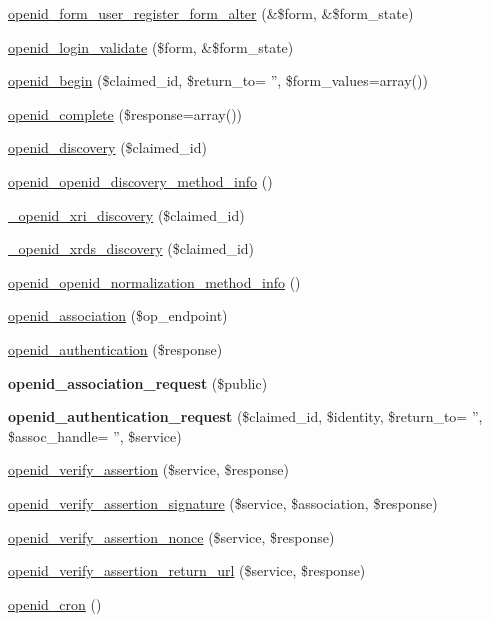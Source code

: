 \begin{DoxyCompactItemize}
\item 
\hyperlink{openid_8module_a3e72c243b50c2c5382c2ca88a9d8798f}{openid\_\-form\_\-user\_\-register\_\-form\_\-alter} (\&\$form, \&\$form\_\-state)
\item 
\hyperlink{openid_8module_aae1394cded5f4c7167dc90307929472c}{openid\_\-login\_\-validate} (\$form, \&\$form\_\-state)
\item 
\hyperlink{openid_8module_a09025e6f08d24b6630a5bc95d26d1fcf}{openid\_\-begin} (\$claimed\_\-id, \$return\_\-to= '', \$form\_\-values=array())
\item 
\hyperlink{openid_8module_a5d4362ca6e1e5f62daa2de3f5b6709f3}{openid\_\-complete} (\$response=array())
\item 
\hyperlink{openid_8module_ae52417e5179c251a3256583ea3e67d30}{openid\_\-discovery} (\$claimed\_\-id)
\item 
\hyperlink{openid_8module_adf3edad18f0e31d9dc5c2ed6429f1983}{openid\_\-openid\_\-discovery\_\-method\_\-info} ()
\item 
\hyperlink{openid_8module_a8fe2a535999c4dbbea783966cf26443f}{\_\-openid\_\-xri\_\-discovery} (\$claimed\_\-id)
\item 
\hyperlink{openid_8module_a90d1aa7f4e4f3778d16564d1db5ecf14}{\_\-openid\_\-xrds\_\-discovery} (\$claimed\_\-id)
\item 
\hyperlink{openid_8module_a24787fe76c0379844feb68970ee993fb}{openid\_\-openid\_\-normalization\_\-method\_\-info} ()
\item 
\hyperlink{openid_8module_a305374e14009f439fbef9733223b6660}{openid\_\-association} (\$op\_\-endpoint)
\item 
\hyperlink{openid_8module_a40916dd14d08da91ecd140824aac9578}{openid\_\-authentication} (\$response)
\item 
\hypertarget{openid_8module_a1a7ae0472128ef1eb4ee9046fc50a67c}{
{\bfseries openid\_\-association\_\-request} (\$public)}
\label{openid_8module_a1a7ae0472128ef1eb4ee9046fc50a67c}

\item 
\hypertarget{openid_8module_a9bed1dc27e01330aed5098920420065d}{
{\bfseries openid\_\-authentication\_\-request} (\$claimed\_\-id, \$identity, \$return\_\-to= '', \$assoc\_\-handle= '', \$service)}
\label{openid_8module_a9bed1dc27e01330aed5098920420065d}

\item 
\hyperlink{openid_8module_a8f328709b317b9c509b5572afa331469}{openid\_\-verify\_\-assertion} (\$service, \$response)
\item 
\hyperlink{openid_8module_ab2abb87e4bd165165d3c851c8a2ac344}{openid\_\-verify\_\-assertion\_\-signature} (\$service, \$association, \$response)
\item 
\hyperlink{openid_8module_adc4a4bdf953124a14a6265264f70ca2e}{openid\_\-verify\_\-assertion\_\-nonce} (\$service, \$response)
\item 
\hyperlink{openid_8module_a523fa00a214374d55f9748c489b2180b}{openid\_\-verify\_\-assertion\_\-return\_\-url} (\$service, \$response)
\item 
\hyperlink{openid_8module_af88e0dcff253cebd08363501020daf76}{openid\_\-cron} ()
\end{DoxyCompactItemize}


